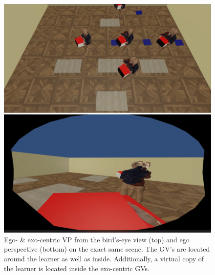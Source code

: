\begin{figure}[H]
	\centering
	\includegraphics[width=\textwidth]{figures/perspectiveEGOEXO.png}
	\caption[Ego- \& exo-centric visual perspective]{Ego- \& exo-centric VP from the bird's-eye view (top) and ego perspective (bottom) on the exact same scene. The GV's are located around the learner as well as inside. Additionally, a virtual copy of the learner is located inside the exo-centric GVs.}
	\label{fig:egoexo}
\end{figure}

